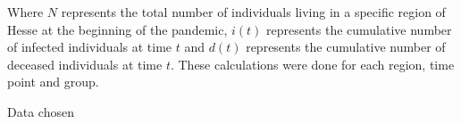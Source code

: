\par
Where $N$ represents the total number of individuals living in a specific region of Hesse at the beginning of the pandemic, $i(t)$
represents the cumulative number of infected individuals at time $t$ and $d(t)$ represents the cumulative number of deceased
individuals at time $t$. These calculations were done for each region, time point and group.

\par
Data chosen
